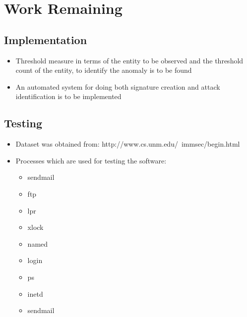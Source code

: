 \section{Work Remaining}

\subsection{Implementation}

\begin{itemize}
    \item[] Threshold measure in terms of the entity to be observed and the threshold count of the entity, to identify the anomaly is to be found
    \item[] An automated system for doing both signature creation and attack identification is to be implemented
\end{itemize}

\subsection{Testing}

    \begin{itemize}
        \item[] Dataset was obtained from: http://www.cs.unm.edu/~immsec/begin.html
        \item[] Processes which are used for testing the software:
            \begin{itemize}
                \item[] sendmail
                \item[] ftp
                \item[] lpr
                \item[] xlock
                \item[] named
                \item[] login
                \item[] ps
                \item[] inetd
                \item[] sendmail
            \end{itemize}
    \end{itemize}
